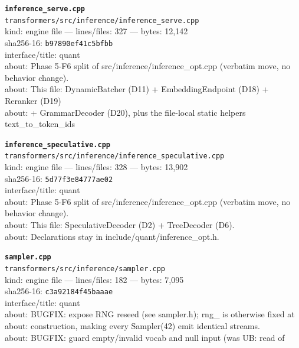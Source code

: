 \noindent\textbf{\texttt{inference\_serve.cpp}}\\
\texttt{transformers/src/inference/inference\_serve.cpp}\\
kind: engine file --- lines/files: 327 --- bytes: 12,142\\
sha256-16: \texttt{b97890ef41c5bfbb}\\
interface/title: quant\\
about: Phase 5-F6 split of src/inference/inference\_opt.cpp (verbatim move, no behavior change).\\
about: This file: DynamicBatcher (D11) + EmbeddingEndpoint (D18) + Reranker (D19)\\
about: + GrammarDecoder (D20), plus the file-local static helpers text\_to\_token\_ids\\
\vspace*{6.0pt}
\newpage

\noindent\textbf{\texttt{inference\_speculative.cpp}}\\
\texttt{transformers/src/inference/inference\_speculative.cpp}\\
kind: engine file --- lines/files: 328 --- bytes: 13,902\\
sha256-16: \texttt{5d77f3e84777ae02}\\
interface/title: quant\\
about: Phase 5-F6 split of src/inference/inference\_opt.cpp (verbatim move, no behavior change).\\
about: This file: SpeculativeDecoder (D2) + TreeDecoder (D6).\\
about: Declarations stay in include/quant/inference\_opt.h.\\
\vspace*{6.0pt}

\noindent\textbf{\texttt{sampler.cpp}}\\
\texttt{transformers/src/inference/sampler.cpp}\\
kind: engine file --- lines/files: 182 --- bytes: 7,095\\
sha256-16: \texttt{c3a92184f45baaae}\\
interface/title: quant\\
about: BUGFIX: expose RNG reseed (see sampler.h); rng\_ is otherwise fixed at\\
about: construction, making every Sampler(42) emit identical streams.\\
about: BUGFIX: guard empty/invalid vocab and null input (was UB: read of\\
\vspace*{6.0pt}

